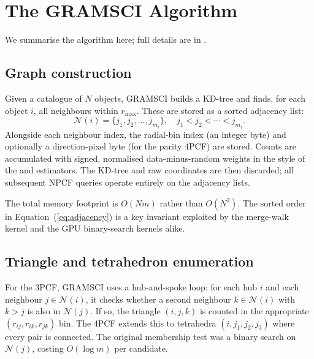 \documentclass[twocolumn]{aastex701}
\newcommand{\rmax}{r_{\mathrm{max}}}
\begin{document}
\section{The GRAMSCI Algorithm}
\label{sec:algorithm}

We summarise the algorithm here; full details are in \citet{sabiu19}.

\subsection{Graph construction}
\label{sec:graph}

Given a catalogue of $N$ objects, GRAMSCI builds a KD-tree and finds, for
each object $i$, all neighbours within $\rmax$.  These are stored as a
sorted adjacency list:
\begin{equation}
  \mathcal{N}(i) = \{j_1, j_2, \ldots, j_{m_i}\}, \quad
  j_1 < j_2 < \cdots < j_{m_i}.
  \label{eq:adjacency}
\end{equation}
Alongside each neighbour index, the radial-bin index (an integer byte) and
optionally a direction-pixel byte (for the parity 4PCF) are stored.
Counts are accumulated with signed, normalised data-minus-random weights
in the style of the \citet{landy93} and \citet{szapudi98} estimators.  The
KD-tree and raw coordinates are then discarded; all subsequent NPCF queries
operate entirely on the adjacency lists.

The total memory footprint is $O(Nm)$ rather than $O(N^2)$.  The sorted
order in Equation~(\ref{eq:adjacency}) is a key invariant exploited by the
merge-walk kernel and the GPU binary-search kernels alike.

\subsection{Triangle and tetrahedron enumeration}
\label{sec:enumeration}

For the 3PCF, GRAMSCI uses a hub-and-spoke loop: for each hub $i$ and each
neighbour $j \in \mathcal{N}(i)$, it checks whether a second neighbour
$k \in \mathcal{N}(i)$ with $k > j$ is also in $\mathcal{N}(j)$.  If so,
the triangle $(i,j,k)$ is counted in the appropriate
$(r_{ij}, r_{ik}, r_{jk})$ bin.  The 4PCF extends this to tetrahedra
$(i, j_1, j_2, j_3)$ where every pair is connected.  The original
membership test was a binary search on $\mathcal{N}(j)$, costing $O(\log
m)$ per candidate.

\end{document}
